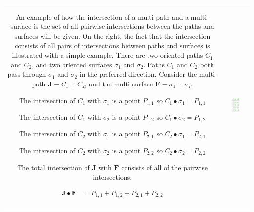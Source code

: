\begin{center}
\begin{tabular}{cc}
\parbox{0.5\textwidth}{
An example of how the intersection of a multi-path and a multi-surface is the set of all pairwise intersections between the paths and surfaces will be given. On the right, the fact that the intersection consists of all pairs of intersections between paths and surfaces is illustrated with a simple example. There are two oriented paths \(C_1\) and \(C_2\), and two oriented surfaces \(\sigma_1\) and \(\sigma_2\). Paths \(C_1\) and \(C_2\) both pass through \(\sigma_1\) and \(\sigma_2\) in the preferred direction. Consider the multi-path \(\mathbf{J} = C_1 + C_2\), and the multi-surface \(\mathbf{F} = \sigma_1 + \sigma_2\). 

The intersection of \(C_1\) with \(\sigma_1\) is a point \(P_{1,1}\) so \\ \(C_1 \bullet \sigma_1 = P_{1,1}\)  

The intersection of \(C_1\) with \(\sigma_2\) is a point \(P_{1,2}\) so \\ \(C_1 \bullet \sigma_2 = P_{1,2}\)  

The intersection of \(C_2\) with \(\sigma_1\) is a point \(P_{2,1}\) so \\ \(C_2 \bullet \sigma_1 = P_{2,1}\)  

The intersection of \(C_2\) with \(\sigma_2\) is a point \(P_{2,2}\) so \\ \(C_2 \bullet \sigma_2 = P_{2,2}\)  

The total intersection of \(\mathbf{J}\) with \(\mathbf{F}\) consists of all of the pairwise intersections:

\begin{align*}
\mathbf{J} \bullet \mathbf{F} & = P_{1,1} + P_{1,2} + P_{2,1} + P_{2,2} 
\end{align*}
} & \parbox{0.4\textwidth}{
\includegraphics[width = 0.4\textwidth]{Intersections/Path-surface_intersections/path_surface_intersection_distributive_law}
}
\end{tabular}
\end{center}

